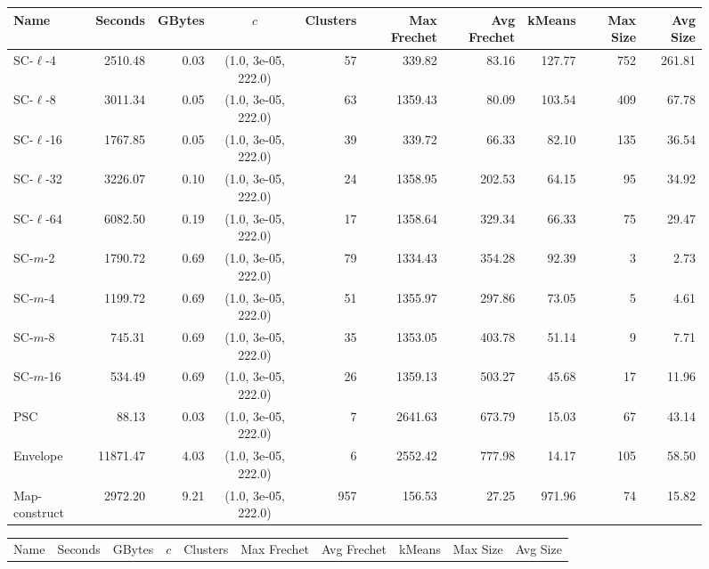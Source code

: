 \clearpage
\newpage 
%
\clearpage
\begin{figure} \begin{center}
    \begin{minipage}{\textwidth}
    {
    \begin{tabular}{@{}lrrcrrrrrr@{}}
        \toprule
        Name & Seconds & GBytes & $c$ & Clusters & Max Frechet & Avg Frechet & kMeans & Max Size & Avg Size\\
        \midrule
        SC-$\ell$-4 & 2510.48 & 0.03 & (1.0, 3e-05, 222.0) & 57 & 339.82 & 83.16 & 127.77 & 752 & 261.81\\
        SC-$\ell$-8 & 3011.34 & 0.05 & (1.0, 3e-05, 222.0) & 63 & 1359.43 & 80.09 & 103.54 & 409 & 67.78\\
        SC-$\ell$-16 & 1767.85 & 0.05 & (1.0, 3e-05, 222.0) & 39 & 339.72 & 66.33 & 82.10 & 135 & 36.54\\
        SC-$\ell$-32 & 3226.07 & 0.10 & (1.0, 3e-05, 222.0) & 24 & 1358.95 & 202.53 & 64.15 & 95 & 34.92\\
        SC-$\ell$-64 & 6082.50 & 0.19 & (1.0, 3e-05, 222.0) & 17 & 1358.64 & 329.34 & 66.33 & 75 & 29.47\\
        SC-$m$-2 & 1790.72 & 0.69 & (1.0, 3e-05, 222.0) & 79 & 1334.43 & 354.28 & 92.39 & 3 & 2.73\\
        SC-$m$-4 & 1199.72 & 0.69 & (1.0, 3e-05, 222.0) & 51 & 1355.97 & 297.86 & 73.05 & 5 & 4.61\\
        SC-$m$-8 & 745.31 & 0.69 & (1.0, 3e-05, 222.0) & 35 & 1353.05 & 403.78 & 51.14 & 9 & 7.71\\
        SC-$m$-16 & 534.49 & 0.69 & (1.0, 3e-05, 222.0) & 26 & 1359.13 & 503.27 & 45.68 & 17 & 11.96\\
        PSC & 88.13 & 0.03 & (1.0, 3e-05, 222.0) & 7 & 2641.63 & 673.79 & 15.03 & 67 & 43.14\\
        Envelope & 11871.47 & 4.03 & (1.0, 3e-05, 222.0) & 6 & 2552.42 & 777.98 & 14.17 & 105 & 58.50\\
        Map-construct & 2972.20 & 9.21 & (1.0, 3e-05, 222.0) & 957 & 156.53 & 27.25 & 971.96 & 74 & 15.82\\
        \bottomrule
    \end{tabular}
    }
    {
    \begin{tabular}{@{}lrrcrrrrrr@{}}
        \toprule
        Name & Seconds & GBytes & $c$ & Clusters & Max Frechet & Avg Frechet & kMeans & Max Size & Avg Size\\

\end{tabular}}
\end{minipage}
\end{center}
\end{figure}
